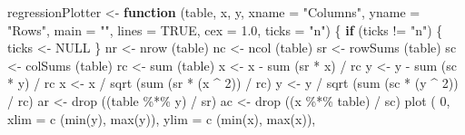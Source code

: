 \documentclass[
  12pt,
]{book}
\newenvironment{Shaded}{\begin{snugshade}}{\end{snugshade}}
\newcommand{\AttributeTok}[1]{\textcolor[rgb]{0.77,0.63,0.00}{#1}}
\newcommand{\ConstantTok}[1]{\textcolor[rgb]{0.00,0.00,0.00}{#1}}
\newcommand{\ControlFlowTok}[1]{\textcolor[rgb]{0.13,0.29,0.53}{\textbf{#1}}}
\newcommand{\DecValTok}[1]{\textcolor[rgb]{0.00,0.00,0.81}{#1}}
\newcommand{\FloatTok}[1]{\textcolor[rgb]{0.00,0.00,0.81}{#1}}
\newcommand{\FunctionTok}[1]{\textcolor[rgb]{0.00,0.00,0.00}{#1}}
\newcommand{\NormalTok}[1]{#1}
\newcommand{\OtherTok}[1]{\textcolor[rgb]{0.56,0.35,0.01}{#1}}
\newcommand{\SpecialCharTok}[1]{\textcolor[rgb]{0.00,0.00,0.00}{#1}}
\newcommand{\StringTok}[1]{\textcolor[rgb]{0.31,0.60,0.02}{#1}}
\begin{document}
\begin{Shaded}
\begin{Highlighting}[]
\NormalTok{regressionPlotter }\OtherTok{\textless{}{-}}
  \ControlFlowTok{function}\NormalTok{ (table,}
\NormalTok{            x,}
\NormalTok{            y,}
            \AttributeTok{xname =} \StringTok{"Columns"}\NormalTok{,}
            \AttributeTok{yname =} \StringTok{"Rows"}\NormalTok{,}
            \AttributeTok{main =} \StringTok{""}\NormalTok{,}
            \AttributeTok{lines =} \ConstantTok{TRUE}\NormalTok{,}
            \AttributeTok{cex =} \FloatTok{1.0}\NormalTok{,}
            \AttributeTok{ticks =} \StringTok{"n"}\NormalTok{) \{}
    \ControlFlowTok{if}\NormalTok{ (ticks }\SpecialCharTok{!=} \StringTok{"n"}\NormalTok{) \{}
\NormalTok{      ticks }\OtherTok{\textless{}{-}} \ConstantTok{NULL}
\NormalTok{    \}}
\NormalTok{    nr }\OtherTok{\textless{}{-}} \FunctionTok{nrow}\NormalTok{ (table)}
\NormalTok{    nc }\OtherTok{\textless{}{-}} \FunctionTok{ncol}\NormalTok{ (table)}
\NormalTok{    sr }\OtherTok{\textless{}{-}} \FunctionTok{rowSums}\NormalTok{ (table)}
\NormalTok{    sc }\OtherTok{\textless{}{-}} \FunctionTok{colSums}\NormalTok{ (table)}
\NormalTok{    rc }\OtherTok{\textless{}{-}} \FunctionTok{sum}\NormalTok{ (table)}
\NormalTok{    x }\OtherTok{\textless{}{-}}\NormalTok{ x }\SpecialCharTok{{-}} \FunctionTok{sum}\NormalTok{ (sr }\SpecialCharTok{*}\NormalTok{ x) }\SpecialCharTok{/}\NormalTok{ rc}
\NormalTok{    y }\OtherTok{\textless{}{-}}\NormalTok{ y }\SpecialCharTok{{-}} \FunctionTok{sum}\NormalTok{ (sc }\SpecialCharTok{*}\NormalTok{ y) }\SpecialCharTok{/}\NormalTok{ rc}
\NormalTok{    x }\OtherTok{\textless{}{-}}\NormalTok{ x }\SpecialCharTok{/} \FunctionTok{sqrt}\NormalTok{ (}\FunctionTok{sum}\NormalTok{ (sr }\SpecialCharTok{*}\NormalTok{ (x }\SpecialCharTok{\^{}} \DecValTok{2}\NormalTok{)) }\SpecialCharTok{/}\NormalTok{ rc)}
\NormalTok{    y }\OtherTok{\textless{}{-}}\NormalTok{ y }\SpecialCharTok{/} \FunctionTok{sqrt}\NormalTok{ (}\FunctionTok{sum}\NormalTok{ (sc }\SpecialCharTok{*}\NormalTok{ (y }\SpecialCharTok{\^{}} \DecValTok{2}\NormalTok{)) }\SpecialCharTok{/}\NormalTok{ rc)}
\NormalTok{    ar }\OtherTok{\textless{}{-}} \FunctionTok{drop}\NormalTok{ ((table }\SpecialCharTok{\%*\%}\NormalTok{ y) }\SpecialCharTok{/}\NormalTok{ sr)}
\NormalTok{    ac }\OtherTok{\textless{}{-}} \FunctionTok{drop}\NormalTok{ ((x }\SpecialCharTok{\%*\%}\NormalTok{ table) }\SpecialCharTok{/}\NormalTok{ sc)}
    \FunctionTok{plot}\NormalTok{ (}
      \DecValTok{0}\NormalTok{,}
      \AttributeTok{xlim =} \FunctionTok{c}\NormalTok{ (}\FunctionTok{min}\NormalTok{(y), }\FunctionTok{max}\NormalTok{(y)),}
      \AttributeTok{ylim =} \FunctionTok{c}\NormalTok{ (}\FunctionTok{min}\NormalTok{(x), }\FunctionTok{max}\NormalTok{(x)),}

\end{Highlighting}
\end{Shaded}
\end{document}
